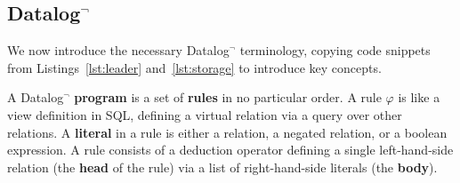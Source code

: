 \subsection{Datalog$^\neg$}
\label{sec:datalog}
We now introduce the necessary Datalog$^\neg$ terminology,
copying code snippets from Listings~\ref{lst:leader} and~\ref{lst:storage} to introduce key concepts.


A Datalog$^\neg$ \textbf{program} is a set of \textbf{rules} in no particular order. 
A rule $\varphi$ is like a view definition in SQL, defining a virtual relation via a query over other relations.
A \textbf{literal} in a rule is either a relation, a negated relation, or a boolean expression.
A rule consists of a deduction operator \ded{:-} defining a single left-hand-side relation (the \textbf{head} of the rule) via a list of right-hand-side literals (the \textbf{body}).

